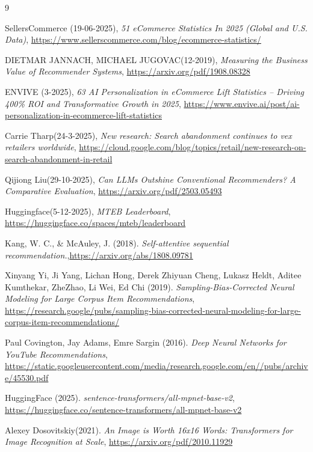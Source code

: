 
\begin{thebibliography}{9}

    SellersCommerce (19-06-2025), \textit{51 eCommerce Statistics In 2025 (Global and U.S. Data)}, \url{https://www.sellerscommerce.com/blog/ecommerce-statistics/}
    
    DIETMAR JANNACH, MICHAEL JUGOVAC(12-2019), \textit{Measuring the Business Value of Recommender Systems}, \url{https://arxiv.org/pdf/1908.08328}

    ENVIVE (3-2025), \textit{63 AI Personalization in eCommerce Lift Statistics – Driving 400\% ROI and Transformative Growth in 2025}, \url{https://www.envive.ai/post/ai-personalization-in-ecommerce-lift-statistics}

    Carrie Tharp(24-3-2025), \textit{New research: Search abandonment continues to vex retailers worldwide}, \url{https://cloud.google.com/blog/topics/retail/new-research-on-search-abandonment-in-retail}

    Qijiong Liu(29-10-2025), \textit{Can LLMs Outshine Conventional Recommenders? A Comparative Evaluation}, \url{https://arxiv.org/pdf/2503.05493}

    Huggingface(5-12-2025), \textit{MTEB Leaderboard}, \url{https://huggingface.co/spaces/mteb/leaderboard}

    Kang, W. C., \& McAuley, J. (2018). \textit{ Self-attentive sequential recommendation.},\url{https://arxiv.org/abs/1808.09781}

    Xinyang Yi, Ji Yang, Lichan Hong, Derek Zhiyuan Cheng, Lukasz Heldt, Aditee Kumthekar, ZheZhao, Li Wei, Ed Chi (2019). \textit{Sampling-Bias-Corrected Neural Modeling for Large Corpus Item Recommendations}, \url{https://research.google/pubs/sampling-bias-corrected-neural-modeling-for-large-corpus-item-recommendations/}

    Paul Covington, Jay Adams, Emre Sargin (2016). \textit{Deep Neural Networks for YouTube Recommendations}, \url{https://static.googleusercontent.com/media/research.google.com/en//pubs/archive/45530.pdf}

    HuggingFace (2025). \textit{sentence-transformers/all-mpnet-base-v2}, \url{https://huggingface.co/sentence-transformers/all-mpnet-base-v2}

     Alexey Dosovitskiy(2021). \textit{An Image is Worth 16x16 Words: Transformers for Image Recognition at Scale}, \url{https://arxiv.org/pdf/2010.11929}


\end{thebibliography}
